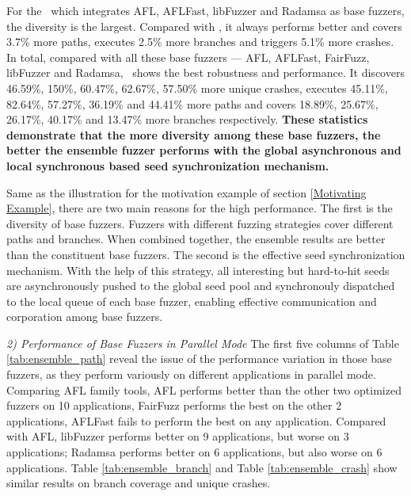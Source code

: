 For the \toolThree ~which integrates AFL, AFLFast, libFuzzer and Radamsa as base fuzzers, the diversity is the largest. Compared with \toolTwo, it always performs better and covers 3.7\% more paths, executes 2.5\% more branches and triggers 5.1\% more crashes. 
In total, compared with all these base fuzzers --- AFL, AFLFast, FairFuzz, libFuzzer and Radamsa, \toolThree ~shows the best robustness and performance. It discovers 46.59\%, 150\%, 60.47\%, 62.67\%, 57.50\% more unique crashes, executes 45.11\%, 82.64\%, 57.27\%, 36.19\% and 44.41\% more paths and covers 18.89\%, 25.67\%, 26.17\%, 40.17\% and 13.47\% more branches respectively. 
\textbf{These statistics demonstrate that the more diversity among these base fuzzers, the better the ensemble fuzzer performs with the global asynchronous and local synchronous based seed synchronization mechanism.} %

Same as the illustration for the motivation example of section \ref{Motivating Example}, there are two main reasons for the high performance. 
The first is the diversity of base fuzzers. Fuzzers with different fuzzing strategies cover different paths and branches. When combined together, the ensemble results are better than the constituent base fuzzers. 
The second is the effective seed synchronization mechanism. With the help of this strategy, all interesting but hard-to-hit seeds are asynchronously pushed to the global seed pool and synchronouly dispatched to the local queue of each base fuzzer, enabling effective communication and corporation among base fuzzers.

\textit{2) Performance of Base Fuzzers in Parallel Mode}
The first five columns of Table \ref{tab:ensemble_path} reveal the issue of the performance variation in those base fuzzers, as they perform variously on different applications in parallel mode. Comparing AFL family tools, AFL performs better than the other two optimized fuzzers on 10 applications, FairFuzz performs the best on the other 2 applications, AFLFast fails to perform the best on any application.
Compared with AFL, libFuzzer performs better on 9 applications, but worse on 3 applications;
Radamsa performs better on 6 applications, but also worse on 6 applications.
Table \ref{tab:ensemble_branch} and Table \ref{tab:ensemble_crash} show similar results on branch coverage and unique crashes.



